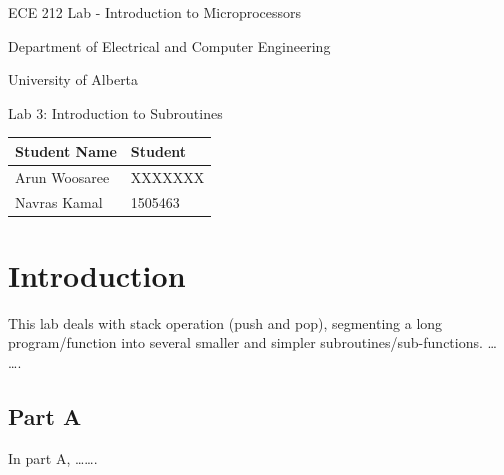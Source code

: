 \documentclass[letterpaper]{article}
\begin{document}
  \begin{titlepage}
    \begin{center}

      \LARGE
      ECE 212 Lab - Introduction to Microprocessors

      Department of Electrical and Computer Engineering

      University of Alberta

      \vspace{2cm}

      Lab 3: Introduction to Subroutines

      \vspace{5cm}
      \Large

      \begin{tabular}{ | m{5cm} | m{5cm} | }
        \hline
        Student Name & Student \\
        \hline
        Arun Woosaree & XXXXXXX \\
        \hline
        Navras Kamal & 1505463 \\
        \hline
      \end{tabular}




    \end{center}
\end{titlepage}


\tableofcontents

\newpage

\section{Introduction}
This lab deals with stack operation (push and pop), segmenting a long program/function into several smaller and simpler subroutines/sub-functions. … ….


  \subsection{Part A}
  In part A, …….
\end{document}
